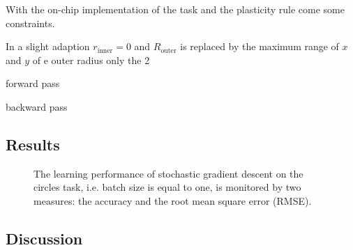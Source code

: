 With the on-chip implementation of the task and the plasticity rule come some constraints.



In a slight adaption $r_{\text{inner}} = 0$ and $R_{\text{outer}}$ is replaced by the maximum range of $x$ and $y$ of e outer radius only the 2
%

forward pass

backward pass

\subsection{Results}


\begin{figure}
	\label{circles_acc}
	\begin{center}
		
	\end{center}
	\caption{The learning performance of stochastic gradient descent on the circles task, i.e. batch size is equal to one, is monitored by two measures: the accuracy and the root mean square error (RMSE).}
\end{figure}
\subsection{Discussion}